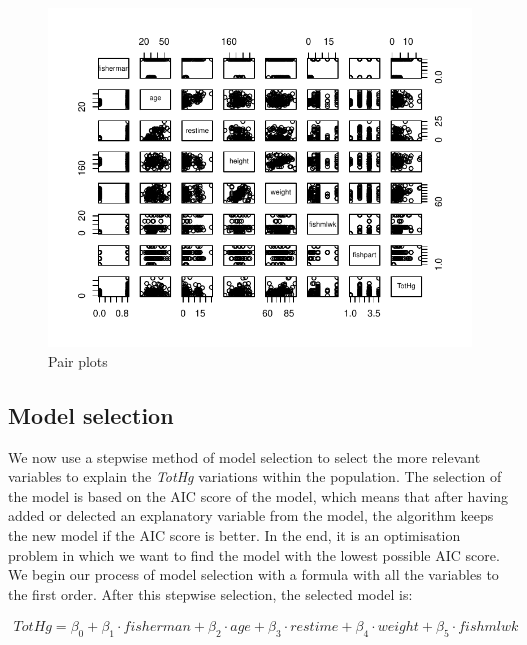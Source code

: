 \documentclass[12pt,]{article}
\begin{document}
\begin{figure}[htbp]

{\centering \includegraphics{Report_files/figure-latex/unnamed-chunk-8-1} 

}

\caption{\label{fig:pair_plots}Pair plots}\label{fig:unnamed-chunk-8}
\end{figure}

\subsection{Model selection}\label{model-selection}

We now use a stepwise method of model selection to select the more
relevant variables to explain the \emph{TotHg} variations within the
population. The selection of the model is based on the AIC score of the
model, which means that after having added or delected an explanatory
variable from the model, the algorithm keeps the new model if the AIC
score is better. In the end, it is an optimisation problem in which we
want to find the model with the lowest possible AIC score. We begin our
process of model selection with a formula with all the variables to the
first order. After this stepwise selection, the selected model is:

\begin{equation}
\label{eqn:fullmodel}
\begin{split}
TotHg = \beta_0 + \beta_1 \cdot fisherman  + \beta_2 \cdot age + \beta_3 \cdot restime + \beta_4 \cdot weight + \beta_5 \cdot fishmlwk
\end{split}
\end{equation}
\end{document}
